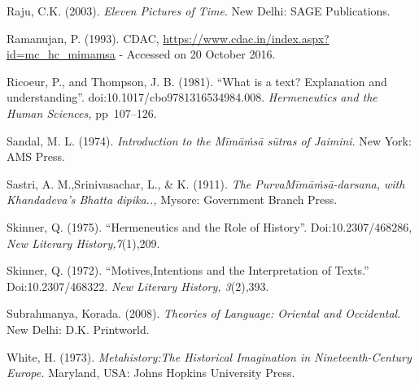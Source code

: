 \begin{thebibliography}{99}
  Raju, C.K. (2003). \textit{Eleven Pictures of Time}. New Delhi: SAGE Publications.

  Ramanujan, P. (1993). CDAC, \url{https://www.cdac.in/index.aspx?id=mc_hc_mimamsa} - Accessed on 20 October 2016.

  Ricoeur, P., and Thompson, J. B. (1981). “What is a text? Explanation and understanding”. doi:10.1017/cbo9781316534984.008. \textit{Hermeneutics and the Human Sciences,} pp~107--126.

  Sandal, M. L. (1974). \textit{Introduction to the Mīmāṁsā sūtras of Jaimini}. New York: AMS Press.

  Sastri, A. M.,Srinivasachar, L., \& K. (1911). \textit{The PurvaMīmāṁsā-darsana, with Khandadeva's Bhatta dipika..,} Mysore: Government Branch Press.

  Skinner, Q. (1975). “Hermeneutics and the Role of History”. Doi:10.2307/468286, \textit{New Literary History,7}(1),209.

  Skinner, Q. (1972). “Motives,Intentions and the Interpretation of Texts.” Doi:10.2307/468322. \textit{New Literary History, 3}(2),393.

  Subrahmanya, Korada. (2008). \textit{Theories of Language: Oriental and Occidental}. New Delhi: D.K. Printworld.

  White, H. (1973). \textit{Metahistory:The Historical Imagination in Nineteenth-Century Europe.} Maryland, USA: Johns Hopkins University Press.

 \end{thebibliography}

